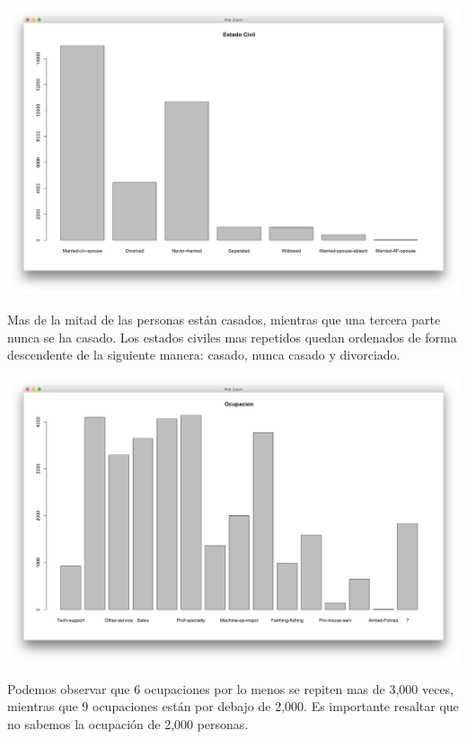 \documentclass{article}
\begin{document}
  \begin{center}
    \hbox{\hspace{-5.5em}\includegraphics[scale=0.4]{graficas/maritalP}}
  \end{center}
  Mas de la mitad de las personas están casados, mientras que una tercera parte nunca se ha casado. Los estados civiles mas repetidos quedan ordenados de forma descendente de la siguiente manera: casado, nunca casado y divorciado.
  \begin{center}
    \hbox{\hspace{-5.5em}\includegraphics[scale=0.4]{graficas/ocupacionP}}
  \end{center}
  Podemos observar que 6 ocupaciones por lo menos se repiten mas de 3,000 veces, mientras que 9 ocupaciones están por debajo de 2,000. Es importante resaltar que no sabemos la ocupación de 2,000 personas.
\end{document}
